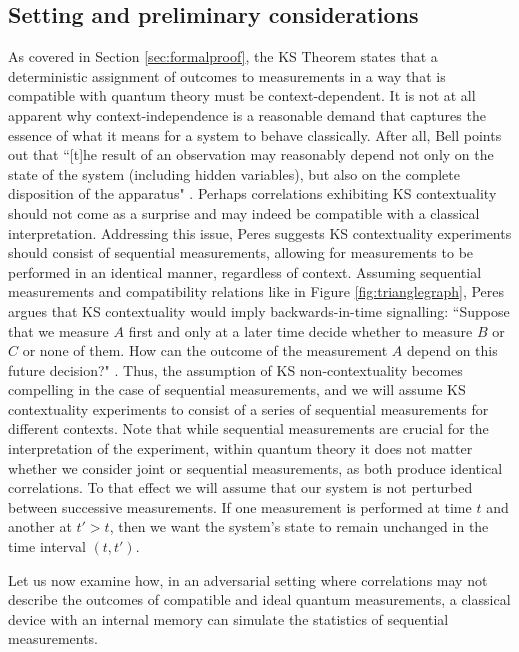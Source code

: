 \subsection{Setting and preliminary considerations}
As covered in Section \ref{sec:formalproof}, the KS Theorem states that a deterministic assignment of outcomes to measurements in a way that is compatible with quantum theory must be context-dependent. It is not at all apparent why context-independence is a reasonable demand that captures the essence of what it means for a system to behave classically. After all, Bell points out that ``[t]he result of an observation may reasonably depend not only
on the state of the system (including hidden variables), but also on the complete disposition of the apparatus" \cite{Bell1966}. Perhaps correlations exhibiting KS contextuality should not come as a surprise and may indeed be compatible with a classical interpretation. Addressing this issue, Peres suggests KS contextuality experiments should consist of sequential measurements, allowing for measurements to be performed in an identical manner, regardless of context. Assuming sequential measurements and compatibility relations like in Figure \ref{fig:trianglegraph}, Peres argues that KS contextuality would imply backwards-in-time signalling: ``Suppose that we measure $A$ first and only at a later time decide whether to measure $B$ or $C$ or none of them. How can the outcome of the measurement $A$ depend on this future decision?" \cite{Peres1998}. Thus, the assumption of KS non-contextuality becomes compelling in the case of sequential measurements, and we will assume KS contextuality experiments to consist of a series of sequential measurements for different contexts. Note that while sequential measurements are crucial for the interpretation of the experiment, within quantum theory it does not matter whether we consider joint or sequential measurements, as both produce identical correlations. To that effect we will assume that our system is not perturbed between successive measurements. If one measurement is performed at time $t$ and another at $t' > t$, then we want the system's state to remain unchanged in the time interval $(t, t')$.

Let us now examine how, in an adversarial setting where correlations may not describe the outcomes of compatible and ideal quantum measurements, a classical device with an internal memory can simulate the statistics of sequential measurements.

